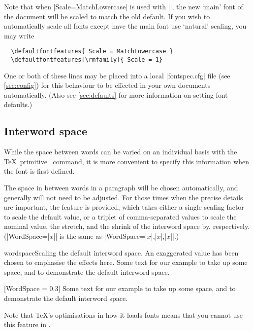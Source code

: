 \documentclass[a4paper]{l3doc}
\begin{document}
Note that when |Scale=MatchLowercase| is used with |\setmainfont|, the new `main'
font of the document will be scaled to match the old default.
If you wish to automatically scale all fonts except have the main font use `natural'
scaling, you may write
\begin{Verbatim}
  \defaultfontfeatures{ Scale = MatchLowercase }
  \defaultfontfeatures[\rmfamily]{ Scale = 1}
\end{Verbatim}
One or both of these lines may be placed into a local |fontspec.cfg| file
(see \vref{sec:config}) for this behaviour to be effected in your own documents
automatically.
(Also see \vref{sec:defaults} for more information on setting font defaults.)




\subsection{Interword space}

While the space between words can be varied on an individual
basis with the \TeX\ primitive \cmd\spaceskip\ command, it is
more convenient to specify this information when the font is
first defined.

The space in between words in a paragraph will be chosen automatically,
and generally will not need to be adjusted. For those
times when the precise details are important, the 
feature is
provided, which takes either a single scaling factor to scale the
default value, or a triplet of comma-separated
values to scale the nominal value, the stretch, and the shrink of the
interword space by, respectively. (|WordSpace={|$x$|}| is the same as
|WordSpace={|$x$|,|$x$|,|$x$|}|.)

\begingroup
\let\centering\relax
\begin{Xexample}{wordspace}{Scaling the default interword space. An exaggerated value has been chosen to emphasise the effects here.}
  Some text for our example to take
  up some space, and to demonstrate
  the default interword space.
  \bigskip

    [WordSpace = 0.3]
  Some text for our example to take
  up some space, and to demonstrate
  the default interword space.
\end{Xexample}
\endgroup

Note that \TeX's optimisations in how it loads fonts means that you cannot
use this feature in .
\end{document}
